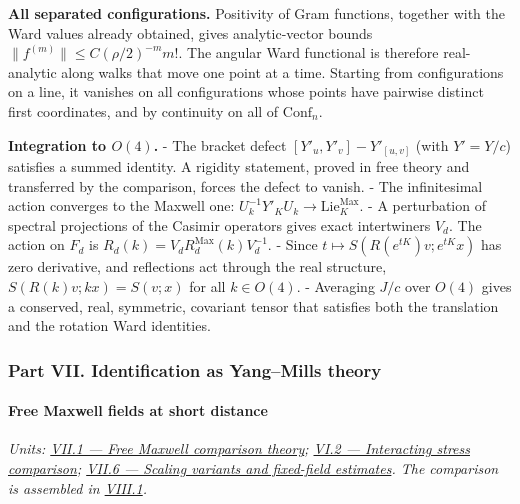 \documentclass[
  letterpaper,
  11pt]{article}
\begin{document}
\textbf{All separated configurations.} Positivity of Gram functions,
together with the Ward values already obtained, gives analytic-vector
bounds \(\lVert f^{(m)}\rVert\le C(\rho/2)^{-m}m!\). The angular Ward
functional is therefore real-analytic along walks that move one point at
a time. Starting from configurations on a line, it vanishes on all
configurations whose points have pairwise distinct first coordinates,
and by continuity on all of \(\mathrm{Conf}_n\).

\textbf{Integration to \(O(4)\).} - The bracket defect
\([Y'_u,Y'_v]-Y'_{[u,v]}\) (with \(Y'=Y/c\)) satisfies a summed
identity. A rigidity statement, proved in free theory and transferred by
the comparison, forces the defect to vanish. - The infinitesimal action
converges to the Maxwell one:
\(U_k^{-1}Y'_KU_k\to\mathrm{Lie}^{\mathrm{Max}}_K\). - A perturbation of
spectral projections of the Casimir operators gives exact intertwiners
\(V_d\). The action on \(F_d\) is
\(R_d(k)=V_dR^{\mathrm{Max}}_d(k)V_d^{-1}\). - Since
\(t\mapsto S(R(e^{tK})v;e^{tK}x)\) has zero derivative, and reflections
act through the real structure, \(S(R(k)v;kx)=S(v;x)\) for all
\(k\in O(4)\). - Averaging \(J/c\) over \(O(4)\) gives a conserved,
real, symmetric, covariant tensor that satisfies both the translation
and the rotation Ward identities.

\subsubsection{Part VII. Identification as Yang--Mills
theory}\label{part-vii.-identification-as-yangmills-theory}

\paragraph{Free Maxwell fields at short
distance}\label{free-maxwell-fields-at-short-distance}

\emph{Units:
\href{https://github.com/scottnarmstrong/yang-mills-informalization/blob/main/outline/units/VII-1.md}{VII.1
--- Free Maxwell comparison theory};
\href{https://github.com/scottnarmstrong/yang-mills-informalization/blob/main/outline/units/VI-2.md}{VI.2
--- Interacting stress comparison};
\href{https://github.com/scottnarmstrong/yang-mills-informalization/blob/main/outline/units/VII-6.md}{VII.6
--- Scaling variants and fixed-field estimates}. The comparison is
assembled in
\href{https://github.com/scottnarmstrong/yang-mills-informalization/blob/main/outline/units/VIII-1.md}{VIII.1}.}
\end{document}
